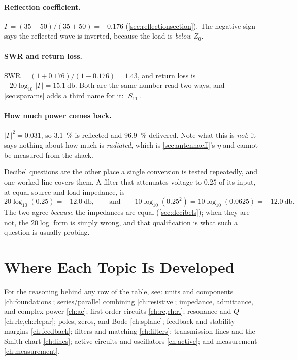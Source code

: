 \paragraph{Reflection coefficient.}
\(\Gamma=(35-50)/(35+50)=-0.176\) (\cref{sec:reflectionsection}). The negative sign
says the reflected wave is inverted, because the load is \emph{below} \(Z_0\).

\paragraph{SWR and return loss.}
\(\mathrm{SWR}=(1+0.176)/(1-0.176)=1.43\), and return loss is
\(-20\log_{10}|\Gamma|=\SI{15.1}{\decibel}\). Both are the same number read two ways,
and \cref{sec:sparams} adds a third name for it: \(|S_{11}|\).

\paragraph{How much power comes back.}
\(|\Gamma|^2=0.031\), so \SI{3.1}{\percent} is reflected and \SI{96.9}{\percent}
delivered. Note what this is \emph{not}: it says nothing about how much is
\emph{radiated}, which is \cref{sec:antennaeff}'s \(\eta\) and cannot be measured from
the shack.

\begin{exambox}
Decibel questions are the other place a single conversion is tested repeatedly, and one
worked line covers them. A filter that attenuates voltage to \(0.25\) of its input, at
equal source and load impedance, is
\[
20\log_{10}(0.25)=-\SI{12.0}{\decibel},
\qquad\text{and}\qquad
10\log_{10}(0.25^2)=10\log_{10}(0.0625)=-\SI{12.0}{\decibel}.
\]
The two agree \emph{because} the impedances are equal (\cref{sec:decibels}); when they
are not, the \(20\log\) form is simply wrong, and that qualification is what such a
question is usually probing.
\end{exambox}

\section{Where Each Topic Is Developed}
For the reasoning behind any row of the table, see: units and components
\cref{ch:foundations}; series/parallel combining \cref{ch:resistive}; impedance,
admittance, and complex power \cref{ch:ac}; first-order circuits \cref{ch:rc,ch:rl};
resonance and \(Q\) \cref{ch:rlc,ch:rlcpar}; poles, zeros, and Bode
\cref{ch:splane}; feedback and stability margins \cref{ch:feedback}; filters and
matching \cref{ch:filters}; transmission lines and the Smith chart \cref{ch:lines};
active circuits and oscillators \cref{ch:active}; and measurement
\cref{ch:measurement}.
